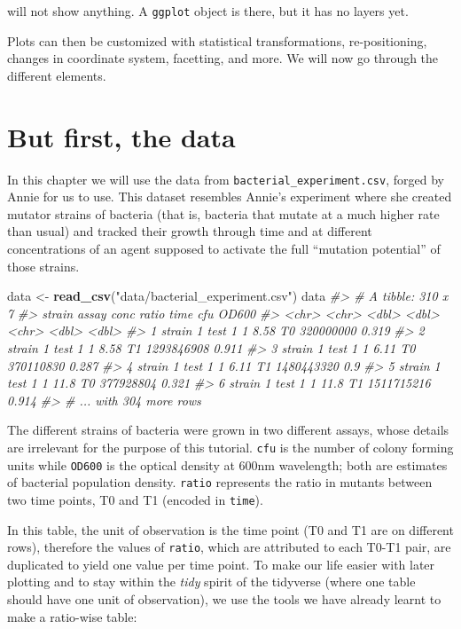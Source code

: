 \documentclass[]{book}
\newenvironment{Shaded}{}{}
\newcommand{\CommentTok}[1]{\textcolor[rgb]{0.38,0.63,0.69}{\textit{#1}}}
\newcommand{\KeywordTok}[1]{\textcolor[rgb]{0.00,0.44,0.13}{\textbf{#1}}}
\newcommand{\NormalTok}[1]{#1}
\newcommand{\StringTok}[1]{\textcolor[rgb]{0.25,0.44,0.63}{#1}}
\begin{document}
will not show anything. A \texttt{ggplot} object is there, but it has no layers yet.

Plots can then be customized with statistical transformations, re-positioning, changes in coordinate system, facetting, and more. We will now go through the different elements.

\hypertarget{but-first-the-data}{%
\section{But first, the data}\label{but-first-the-data}}

In this chapter we will use the data from \texttt{bacterial\_experiment.csv}, forged by Annie for us to use. This dataset resembles Annie's experiment where she created mutator strains of bacteria (that is, bacteria that mutate at a much higher rate than usual) and tracked their growth through time and at different concentrations of an agent supposed to activate the full ``mutation potential'' of those strains.

\begin{Shaded}
\begin{Highlighting}[]
\NormalTok{data <-}\StringTok{ }\KeywordTok{read_csv}\NormalTok{(}\StringTok{"data/bacterial_experiment.csv"}\NormalTok{)}
\NormalTok{data}
\CommentTok{#> # A tibble: 310 x 7}
\CommentTok{#>   strain   assay   conc ratio time         cfu OD600}
\CommentTok{#>   <chr>    <chr>  <dbl> <dbl> <chr>      <dbl> <dbl>}
\CommentTok{#> 1 strain 1 test 1     1  8.58 T0     320000000 0.319}
\CommentTok{#> 2 strain 1 test 1     1  8.58 T1    1293846908 0.911}
\CommentTok{#> 3 strain 1 test 1     1  6.11 T0     370110830 0.287}
\CommentTok{#> 4 strain 1 test 1     1  6.11 T1    1480443320 0.9  }
\CommentTok{#> 5 strain 1 test 1     1 11.8  T0     377928804 0.321}
\CommentTok{#> 6 strain 1 test 1     1 11.8  T1    1511715216 0.914}
\CommentTok{#> # ... with 304 more rows}
\end{Highlighting}
\end{Shaded}

The different strains of bacteria were grown in two different assays, whose details are irrelevant for the purpose of this tutorial. \texttt{cfu} is the number of colony forming units while \texttt{OD600} is the optical density at 600nm wavelength; both are estimates of bacterial population density. \texttt{ratio} represents the ratio in mutants between two time points, T0 and T1 (encoded in \texttt{time}).

In this table, the unit of observation is the time point (T0 and T1 are on different rows), therefore the values of \texttt{ratio}, which are attributed to each T0-T1 pair, are duplicated to yield one value per time point. To make our life easier with later plotting and to stay within the \emph{tidy} spirit of the tidyverse (where one table should have one unit of observation), we use the tools we have already learnt to make a ratio-wise table:
\end{document}
